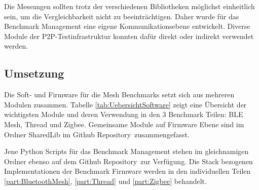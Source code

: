 Die Messungen sollten trotz der verschiedenen Bibliotheken möglichst einheitlich sein, um die Vergleichbarkeit nicht zu beeinträchtigen.
Daher wurde für das Benchmark Management eine eigene Kommunikationsebene entwickelt.
Diverse Module der P2P-Testinfrastruktur konnten dafür direkt oder indirekt verwendet werden.

\newpage
\subsection{Umsetzung}\label{subsec:Software_Umsetzung}
Die Soft- und Firmware für die Mesh Benchmarks setzt sich aus mehreren Modulen zusammen. Tabelle \ref{tab:UebersichtSoftware} zeigt eine Übersicht der wichtigsten Module und deren Verwendung in den 3 Benchmark Teilen: BLE Mesh, Thread und Zigbee.
Gemeinsame Module auf Firmware Ebene sind im Ordner SharedLib im Github Repository\footnotemark\ zusammengefasst.

Jene Python Scripts für das Benchmark Management stehen im gleichnamigen Ordner ebenso auf dem Github Repository\footnotemark\ zur Verfügung.
Die Stack bezogenen Implementationen der Benchmark Firmware werden in den individuellen Teilen \ref{part:BluetoothMesh}, \ref{part:Thread} und \ref{part:Zigbee} behandelt.


